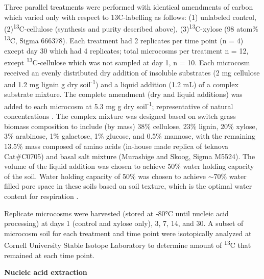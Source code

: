 Three parallel treatments were performed with identical amendments of carbon which varied only with respect to 13C-labelling as follows: (1) unlabeled control,(2)\textsuperscript{13}C-cellulose (synthesis and purity described above), (3)\textsuperscript{13}C-xylose (98 atom\% \textsuperscript{13}C, Sigma 666378). Each treatment had 2 replicates per time point (n = 4) except day 30 which had 4 replicates; total microcosms per treatment n = 12, except \textsuperscript{13}C-cellulose which was not sampled at day 1, n = 10. Each microcosm received an evenly distributed dry addition of insoluble substrates (2 mg cellulose and 1.2 mg lignin g dry soil\textsuperscript{-1}) and a liquid addition (1.2 mL) of a complex substrate mixture. The complete amendment (dry and liquid additions) was added to each microcosm at 5.3 mg g dry soil\textsuperscript{-1}; representative of natural concentrations \cite{Schneckenberger_2008}. The complex mixture was designed based on switch grass biomass composition \cite{Yan_2010,David_2010} to include (by mass) 38\% cellulose, 23\% lignin, 20\% xylose, 3\% arabinose, 1\% galactose, 1\% glucose, and 0.5\% mannose, with the remaining 13.5\% mass composed of amino acids (in-house made replica of teknova Cat#C0705) and basal salt mixture (Murashige and Skoog, Sigma M5524). The volume of the liquid addition was chosen to achieve 50\% water holding capacity of the soil. Water holding capacity of 50\% was chosen to achieve $\sim$70\% water filled pore space in these soils based on soil texture, which is the optimal water content for respiration \cite{Linn_1984,Linn_1984}.

Replicate microcosms were harvested (stored at -80°C until nucleic acid processing) at days 1 (control and xylose only), 3, 7, 14, and 30. A subset of microcosm soil for each treatment and time point were isotopically analyzed at Cornell University Stable Isotope Laboratory to determine amount of \textsuperscript{13}C that remained at each time point.   

\textbf{Nucleic acid extraction}

